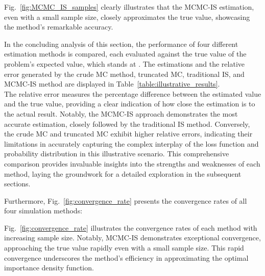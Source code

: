     
    
    Fig.~\ref{fig:MCMC_IS_samples} clearly illustrates that the MCMC-IS estimation, even with a small sample size, closely approximates the true value, showcasing the method's remarkable accuracy.
    
    In the concluding analysis of this section, the performance of four different estimation methods is compared, each evaluated against the true value of the problem's expected value, which stands at \TrueValue. The estimations and the relative error generated by the crude MC method, truncated MC, traditional IS, and MCMC-IS method are displayed in Table~\ref{table:illustrative_results}. \\
        
    

    The relative error measures the percentage difference between the estimated value and the true value, providing a clear indication of how close the estimation is to the actual result. Notably, the MCMC-IS approach demonstrates the most accurate estimation, closely followed by the traditional IS method. Conversely, the crude MC and truncated MC exhibit higher relative errors, indicating their limitations in accurately capturing the complex interplay of the loss function and probability distribution in this illustrative scenario. This comprehensive comparison provides invaluable insights into the strengths and weaknesses of each method, laying the groundwork for a detailed exploration in the subsequent sections.

    Furthermore, Fig.~\ref{fig:convergence_rate} presents the convergence rates of all four simulation methods:

    
    
    Fig.~\ref{fig:convergence_rate} illustrates the convergence rates of each method with increasing sample size. Notably, MCMC-IS demonstrates exceptional convergence, approaching the true value rapidly even with a small sample size. This rapid convergence underscores the method’s efficiency in approximating the optimal importance density function.

    
        
        
